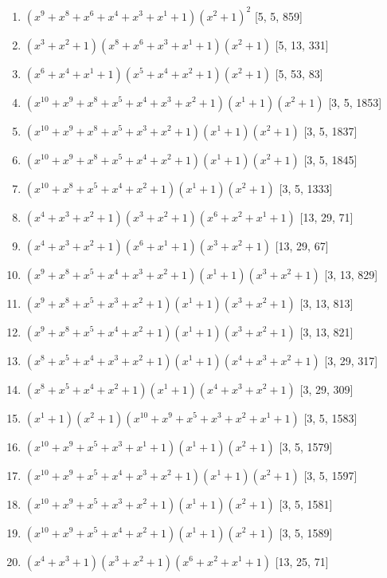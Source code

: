 \documentclass[10pt,twocolumn]{article}
\begin{document}
\begin{enumerate}
\item $(x^{9} + x^{8} + x^{6} + x^{4} + x^{3} + x^{1} + 1)(x^{2} + 1)^{2}$  [5, 5, 859]
\item $(x^{3} + x^{2} + 1)(x^{8} + x^{6} + x^{3} + x^{1} + 1)(x^{2} + 1)$  [5, 13, 331]
\item $(x^{6} + x^{4} + x^{1} + 1)(x^{5} + x^{4} + x^{2} + 1)(x^{2} + 1)$  [5, 53, 83]
\item $(x^{10} + x^{9} + x^{8} + x^{5} + x^{4} + x^{3} + x^{2} + 1)(x^{1} + 1)(x^{2} + 1)$  [3, 5, 1853]
\item $(x^{10} + x^{9} + x^{8} + x^{5} + x^{3} + x^{2} + 1)(x^{1} + 1)(x^{2} + 1)$  [3, 5, 1837]
\item $(x^{10} + x^{9} + x^{8} + x^{5} + x^{4} + x^{2} + 1)(x^{1} + 1)(x^{2} + 1)$  [3, 5, 1845]
\item $(x^{10} + x^{8} + x^{5} + x^{4} + x^{2} + 1)(x^{1} + 1)(x^{2} + 1)$  [3, 5, 1333]
\item $(x^{4} + x^{3} + x^{2} + 1)(x^{3} + x^{2} + 1)(x^{6} + x^{2} + x^{1} + 1)$  [13, 29, 71]
\item $(x^{4} + x^{3} + x^{2} + 1)(x^{6} + x^{1} + 1)(x^{3} + x^{2} + 1)$  [13, 29, 67]
\item $(x^{9} + x^{8} + x^{5} + x^{4} + x^{3} + x^{2} + 1)(x^{1} + 1)(x^{3} + x^{2} + 1)$  [3, 13, 829]
\item $(x^{9} + x^{8} + x^{5} + x^{3} + x^{2} + 1)(x^{1} + 1)(x^{3} + x^{2} + 1)$  [3, 13, 813]
\item $(x^{9} + x^{8} + x^{5} + x^{4} + x^{2} + 1)(x^{1} + 1)(x^{3} + x^{2} + 1)$  [3, 13, 821]
\item $(x^{8} + x^{5} + x^{4} + x^{3} + x^{2} + 1)(x^{1} + 1)(x^{4} + x^{3} + x^{2} + 1)$  [3, 29, 317]
\item $(x^{8} + x^{5} + x^{4} + x^{2} + 1)(x^{1} + 1)(x^{4} + x^{3} + x^{2} + 1)$  [3, 29, 309]
\item $(x^{1} + 1)(x^{2} + 1)(x^{10} + x^{9} + x^{5} + x^{3} + x^{2} + x^{1} + 1)$  [3, 5, 1583]
\item $(x^{10} + x^{9} + x^{5} + x^{3} + x^{1} + 1)(x^{1} + 1)(x^{2} + 1)$  [3, 5, 1579]
\item $(x^{10} + x^{9} + x^{5} + x^{4} + x^{3} + x^{2} + 1)(x^{1} + 1)(x^{2} + 1)$  [3, 5, 1597]
\item $(x^{10} + x^{9} + x^{5} + x^{3} + x^{2} + 1)(x^{1} + 1)(x^{2} + 1)$  [3, 5, 1581]
\item $(x^{10} + x^{9} + x^{5} + x^{4} + x^{2} + 1)(x^{1} + 1)(x^{2} + 1)$  [3, 5, 1589]
\item $(x^{4} + x^{3} + 1)(x^{3} + x^{2} + 1)(x^{6} + x^{2} + x^{1} + 1)$  [13, 25, 71]

\end{enumerate}
\end{document}
